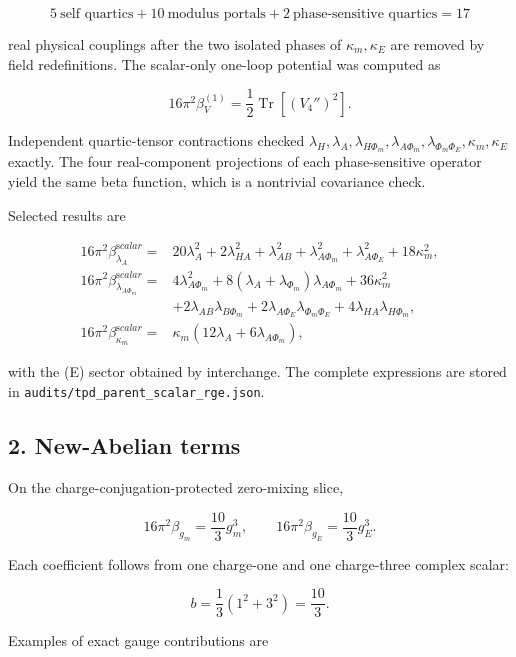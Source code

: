 \documentclass[
]{article}
\begin{document}
\[
5\ \text{self quartics}+10\ \text{modulus portals}
+2\ \text{phase-sensitive quartics}=17
\]

real physical couplings after the two isolated phases of
\(\kappa_m,\kappa_E\) are removed by field redefinitions. The
scalar-only one-loop potential was computed as

\[
16\pi^2\beta_V^{(1)}=\frac12\operatorname{Tr}\!\left[(V_4'')^2\right].
\]

Independent quartic-tensor contractions checked
\(\lambda_H,\lambda_A,\lambda_{H\Phi_m},\lambda_{A\Phi_m}, \lambda_{\Phi_m\Phi_E},\kappa_m,\kappa_E\)
exactly. The four real-component projections of each phase-sensitive
operator yield the same beta function, which is a nontrivial covariance
check.

Selected results are

\[
\begin{aligned}
16\pi^2\beta_{\lambda_A}^{\mathrm scalar}
={}&20\lambda_A^2+2\lambda_{HA}^2+\lambda_{AB}^2
+\lambda_{A\Phi_m}^2+\lambda_{A\Phi_E}^2+18\kappa_m^2,\\
16\pi^2\beta_{\lambda_{A\Phi_m}}^{\mathrm scalar}
={}&4\lambda_{A\Phi_m}^2
+8(\lambda_A+\lambda_{\Phi_m})\lambda_{A\Phi_m}
+36\kappa_m^2\\
&+2\lambda_{AB}\lambda_{B\Phi_m}
+2\lambda_{A\Phi_E}\lambda_{\Phi_m\Phi_E}
+4\lambda_{HA}\lambda_{H\Phi_m},\\
16\pi^2\beta_{\kappa_m}^{\mathrm scalar}
={}&\kappa_m(12\lambda_A+6\lambda_{A\Phi_m}),
\end{aligned}
\]

with the (E) sector obtained by interchange. The complete expressions
are stored in \texttt{audits/tpd\_parent\_scalar\_rge.json}.

\hypertarget{new-abelian-terms}{%
\subsection{2. New-Abelian terms}\label{new-abelian-terms}}

On the charge-conjugation-protected zero-mixing slice,

\[
16\pi^2\beta_{g_m}=\frac{10}{3}g_m^3,
\qquad
16\pi^2\beta_{g_E}=\frac{10}{3}g_E^3.
\]

Each coefficient follows from one charge-one and one charge-three
complex scalar:

\[
b=\frac13(1^2+3^2)=\frac{10}{3}.
\]

Examples of exact gauge contributions are
\end{document}

